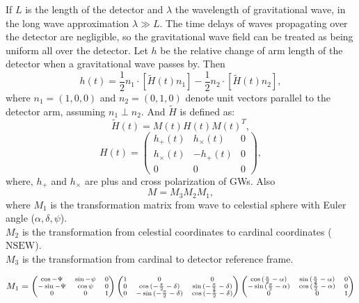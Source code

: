 \documentclass{ttuthes2007}
\begin{document}
If $L$ is the length of the detector and $\lambda$ the wavelength of gravitational
wave, in the long wave approximation $\lambda \gg L$. The time delays of
waves propagating over the detector are negligible, so the
gravitational wave field can be treated as being uniform all over the detector.
Let $h$ be the relative change of arm length of the detector when a gravitational wave
passes by. Then
\begin{equation}
h(t) = \frac{1}{2} n_1\cdot[\tilde{H}(t)n_1] - \frac{1}{2} n_2\cdot [\tilde{H}(t)n_2],
\end{equation}
where $n_1=(1,0,0)$ and $n_2=(0,1,0)$ denote unit vectors parallel to the
detector arm, assuming $n_1 \perp n_2$. And $\tilde{H}$ is defined as:
\begin{equation}
\tilde{H}(t) = M(t)H(t)M(t)^T,
\end{equation}
\begin{equation*}
H(t)=
\begin{pmatrix}
h_+(t) & h_\times(t) & 0\\
h_\times(t) & -h_+(t) & 0\\
0 & 0 & 0
\end{pmatrix},
\end{equation*}
where, $h_+$ and $h_\times$ are plus and cross polarization of \acp{GW}. Also
\begin{equation}
M= M_3 M_2 M_1,
\end{equation}
where
$M_1$ is the transformation matrix from wave to celestial sphere with
Euler angle ($\alpha,\delta,\psi$).\\
$M_2$ is the transformation from celestial coordinates to cardinal
coordinates ($\mathrm{NSEW}$).\\
$M_3$ is the transformation from cardinal to detector reference frame.

\begin{equation}
\scriptsize
M_1=
\begin{pmatrix}
\cos{-\Psi} & \sin{-\psi}& 0\\
-\sin{-\Psi} & \cos{\psi}& 0\\
0 & 0 & 1
\end{pmatrix}
\begin{pmatrix}
1 & 0 & 0\\
0 & \cos{(-\frac{\pi}{2}-\delta)} & \sin{(-\frac{\pi}{2}-\delta)}\\
0 & -\sin{(-\frac{\pi}{2}-\delta)} & \cos{(-\frac{\pi}{2}-\delta)}
\end{pmatrix}
\begin{pmatrix}
\cos{(\frac{\pi}{2}-\alpha)} & \sin{(\frac{\pi}{2}-\alpha)} & 0\\
-\sin{(\frac{\pi}{2}-\alpha)} & \cos{(\frac{\pi}{2}-\alpha)} & 0\\
0 & 0 & 1 
\end{pmatrix}
\end{equation}
\end{document}
